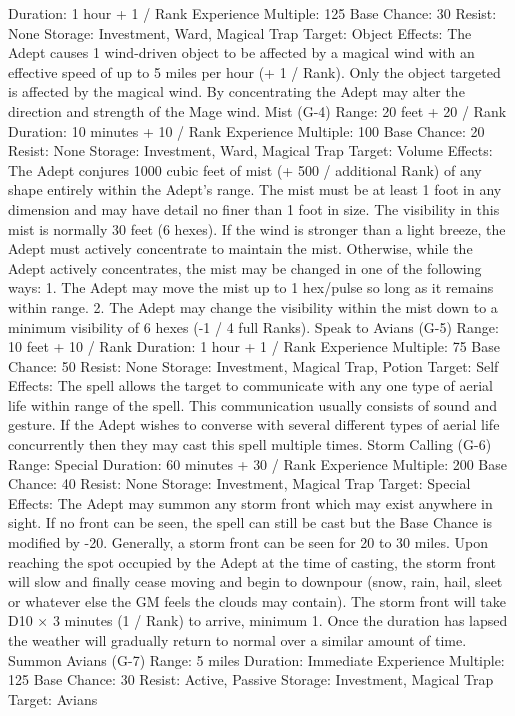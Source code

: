 \documentclass[a4paper]{article}
\begin{document}
\begin{multicols}{3}
Duration: 1 hour + 1 / Rank
Experience Multiple: 125
Base Chance: 30%
Resist: None
Storage: Investment, Ward, Magical Trap
Target: Object
Effects: The Adept causes 1 wind-driven object to
be affected by a magical wind with an effective
speed of up to 5 miles per hour (+ 1 / Rank). Only
the object targeted is affected by the magical wind.
By concentrating the Adept may alter the direction
and strength of the Mage wind.
Mist (G-4)
Range: 20 feet + 20 / Rank
Duration: 10 minutes + 10 / Rank
Experience Multiple: 100
Base Chance: 20%
Resist: None
Storage: Investment, Ward, Magical Trap
Target: Volume
Effects: The Adept conjures 1000 cubic feet of mist
(+ 500 / additional Rank) of any shape entirely
within the Adept’s range. The mist must be at least
1 foot in any dimension and may have detail no
finer than 1 foot in size. The visibility in this mist
is normally 30 feet (6 hexes). If the wind is
stronger than a light breeze, the Adept must actively concentrate to maintain the mist. Otherwise,
while the Adept actively concentrates, the mist
may be changed in one of the following ways:
1. The Adept may move the mist up to 1 hex/pulse
so long as it remains within range.
2. The Adept may change the visibility within the
mist down to a minimum visibility of 6 hexes (-1 /
4 full Ranks).
Speak to Avians (G-5)
Range: 10 feet + 10 / Rank
Duration: 1 hour + 1 / Rank
Experience Multiple: 75
Base Chance: 50%
Resist: None
Storage: Investment, Magical Trap, Potion
Target: Self
Effects: The spell allows the target to communicate
with any one type of aerial life within range of the
spell. This communication usually consists of
sound and gesture. If the Adept wishes to converse
with several different types of aerial life concurrently then they may cast this spell multiple times.
Storm Calling (G-6)
Range: Special
Duration: 60 minutes + 30 / Rank
Experience Multiple: 200
Base Chance: 40%
Resist: None
Storage: Investment, Magical Trap
Target: Special
Effects: The Adept may summon any storm front
which may exist anywhere in sight. If no front can
be seen, the spell can still be cast but the Base
Chance is modified by -20. Generally, a storm
front can be seen for 20 to 30 miles. Upon reaching
the spot occupied by the Adept at the time of casting, the storm front will slow and finally cease
moving and begin to downpour (snow, rain, hail,
sleet or whatever else the GM feels the clouds may
contain). The storm front will take D10 × 3 minutes (1 / Rank) to arrive, minimum 1. Once the
duration has lapsed the weather will gradually
return to normal over a similar amount of time.
Summon Avians (G-7)
Range: 5 miles
Duration: Immediate
Experience Multiple: 125
Base Chance: 30%
Resist: Active, Passive
Storage: Investment, Magical Trap
Target: Avians


\end{multicols}
\end{document}
